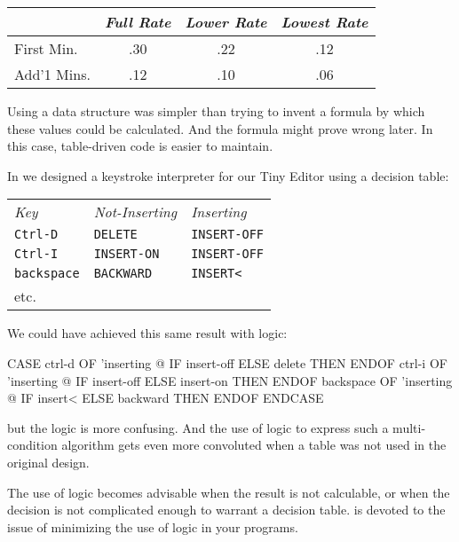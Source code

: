 \bigskip
\begin{tabular}{lccc}
          & \emph{Full Rate} & \emph{Lower Rate} & \emph{Lowest Rate} \\ \hline
First Min.  &       .30        &        .22        &          .12 \\ \hline
Add'1 Mins. &       .12        &        .10        &          .06 \\ \hline
\end{tabular}
\bigskip

\noindent Using a data structure was simpler than trying to invent a
formula by which these values could be calculated. And the formula might
prove wrong later. In this case, table-driven code is easier to maintain.

In  we designed a keystroke interpreter for our Tiny
Editor using a decision table:

\medskip
\begin{tabular}{lll}
\emph{Key}         & \emph{Not-Inserting} & \emph{Inserting} \\
\texttt{Ctrl-D}    & \texttt{DELETE}      & \texttt{INSERT-OFF} \\
\texttt{Ctrl-I}    & \texttt{INSERT-ON}   & \texttt{INSERT-OFF} \\
\texttt{backspace} & \texttt{BACKWARD}    & \texttt{INSERT<} \\
etc. & &
\end{tabular}
\medskip

\medbreak\noindent
We could have achieved this same result with logic:
\begin{Code}
CASE
   ctrl-d     OF  'inserting @  IF
      insert-off   ELSE  delete     THEN   ENDOF
   ctrl-i     OF  'inserting @  IF
      insert-off   ELSE  insert-on  THEN   ENDOF
   backspace  OF  'inserting @  IF
      insert<      ELSE  backward   THEN   ENDOF
ENDCASE
\end{Code}
but the logic is more confusing. And the use of logic to express such a
multi-condition algorithm gets even more convoluted when a table was
not used in the original design.

The use of logic becomes advisable when the result is not calculable,
or when the decision is not complicated enough to warrant a decision
table.  is devoted to the issue of minimizing the use of logic
in your programs.

